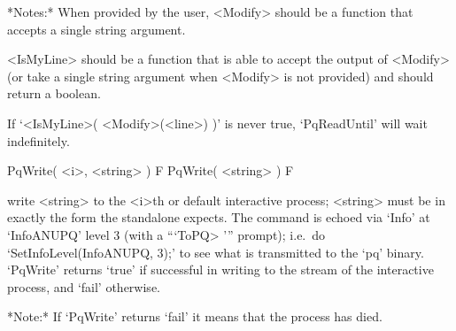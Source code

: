 *Notes:* 
When provided by the user, <Modify> should be a function that  accepts  a
single string argument.

<IsMyLine> should be a function that is able  to  accept  the  output  of
<Modify> (or take a single string argument when <Modify> is not provided)
and should return a boolean.

If `<IsMyLine>( <Modify>(<line>) )' is  never  true,  `PqReadUntil'  will
wait indefinitely.

\>PqWrite( <i>, <string> ) F
\>PqWrite( <string> ) F

write <string> to the <i>th  or  default  interactive  {\ANUPQ}  process;
<string> must be in exactly the form the {\ANUPQ} standalone expects. The
command is echoed via `Info' at `InfoANUPQ' level 3 (with a  ```ToPQ> '''
prompt); i.e.~do `SetInfoLevel(InfoANUPQ, 3);' to see what is transmitted
to the `pq' binary. `PqWrite' returns `true' if successful in writing  to
the stream of the interactive {\ANUPQ} process, and `fail' otherwise.

*Note:*
If `PqWrite' returns `fail' it means that the {\ANUPQ} process has died.

